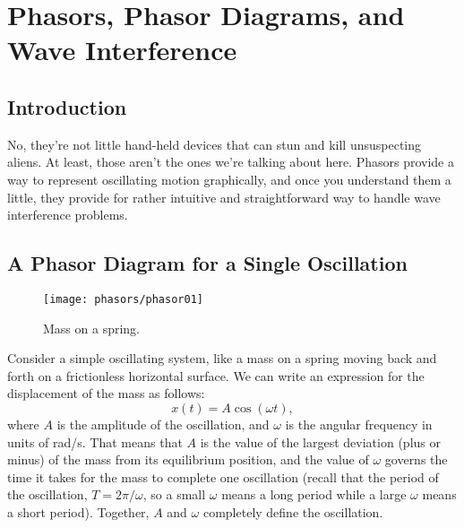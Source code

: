 
\chapter[Phasor Diagrams]{Phasors, Phasor Diagrams, and Wave Interference}
\label{chapter:phasors}

\section{Introduction}

No, they're not little hand-held devices that can stun and kill
unsuspecting aliens. At least, those aren't the ones we're talking
about here. Phasors provide a way to represent oscillating motion
graphically, and once you understand them a little, they provide for
rather intuitive and straightforward way to handle wave interference
problems.

\section{A Phasor Diagram for a Single Oscillation}

\begin{figure}\begin{center}
 \texttt{[image: phasors/phasor01]} 
\caption{\label{fig:phasor01} Mass on a spring.}
\end{center}
\end{figure}


Consider a simple oscillating system, like a mass on a spring moving
back and forth on a frictionless horizontal surface.
We can write an expression for the displacement of the mass as follows:
\begin{equation}
x(t) = A\cos{(\omega t)},
\end{equation} 
where $A$ is the amplitude of the oscillation, and $\omega$ is the
angular frequency in units of rad/s. That means that $A$ is
the value of the largest deviation (plus or minus) of the mass from
its equilibrium position, and the value of $\omega$ governs the time it
takes for the mass to complete one oscillation (recall that the period
of the oscillation, $T = 2\pi/\omega$, so a small $\omega$
means a long period while a large $\omega$ means a short period).
Together, $A$ and $\omega$ completely define the oscillation.


